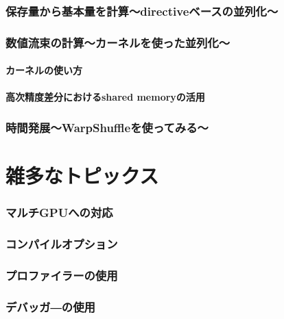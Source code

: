 \documentclass{ltjsarticle}
\begin{document}
\section{保存量から基本量を計算～directiveベースの並列化～}


\section{数値流束の計算～カーネルを使った並列化～}
\subsection{カーネルの使い方}


\subsection{高次精度差分におけるshared memoryの活用}


\section{時間発展～WarpShuffleを使ってみる～}


\clearpage

\part{雑多なトピックス}
\section{マルチGPUへの対応}


\section{コンパイルオプション}


\section{プロファイラーの使用}


\section{デバッガ―の使用}

\end{document}
